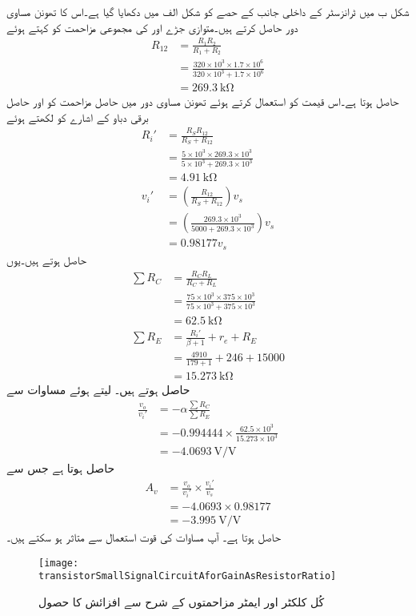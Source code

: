 شکل  ب میں ٹرانزسٹر کے داخلی جانب کے حصے کو شکل  الف  میں دکھایا گیا ہے۔اس کا تھونن مساوی دور حاصل کرتے ہیں۔متوازی جڑے  اور  کی مجموعی مزاحمت کو  کہتے ہوئے
\begin{align*}
R_{12}&=\frac{R_1 R_2}{R_1+R_2}\\
&=\frac{320 \times 10^3 \times 1.7 \times 10^6}{320 \times 10^3 + 1.7 \times 10^6}\\
&=\SI{269.3}{\kilo \ohm}
\end{align*}
حاصل ہوتا ہے۔اس قیمت کو استعمال کرتے ہوئے تھونن مساوی دور میں حاصل مزاحمت کو  اور حاصل برقی دباو کے اشارے کو  لکھتے ہوئے
\begin{align*}
R_i'&=\frac{R_S R_{12}}{R_S+R_{12}}\\
&=\frac{5\times 10^3 \times 269.3 \times 10^3}{5\times 10^3 + 269.3 \times 10^3}\\
&=\SI{4.91}{\kilo \ohm}\\
v_i'&=\left(\frac{R_{12}}{R_S+R_{12}} \right) v_s\\
&=\left(\frac{269.3 \times 10^3}{5000+269.3 \times 10^3} \right) v_s\\
&=0.98177 v_s
\end{align*}
حاصل ہوتے ہیں۔یوں
\begin{align*}
\sum R_C&=\frac{R_C R_L}{R_C+R_L}\\
&=\frac{75 \times 10^3 \times 375 \times 10^3}{75 \times 10^3 + 375 \times 10^3}\\
&=\SI{62.5}{\kilo \ohm}\\
\sum R_E&=\frac{R_i'}{\beta+1}+r_e+R_E\\
&=\frac{4910}{179+1}+246+15000\\
&=\SI{15.273}{\kilo \ohm}
\end{align*}
حاصل ہوتے ہیں۔  لیتے ہوئے  مساوات  سے
\begin{align*}
\frac{v_o}{v_i'}&=-\alpha \frac{\sum R_C}{\sum R_E}\\
&= -0.994444 \times \frac{62.5 \times 10^3}{15.273 \times 10^3}\\
&=\SI{-4.0693}{\volt \per \volt}
\end{align*}
حاصل ہوتا ہے جس سے
\begin{align*}
A_v&=\frac{v_o}{v_i'} \times \frac{v_i'}{v_s}\\
&=-4.0693 \times 0.98177\\
&=\SI{-3.995}{\volt \per \volt}
\end{align*}
حاصل ہوتا ہے۔ آپ مساوات  کی قوت استعمال سے متاثر ہو سکتے ہیں۔
\begin{figure}
\centering
\texttt{[image: transistorSmallSignalCircuitAforGainAsResistorRatio]}
\caption{کُل کلکٹر  اور ایمٹر مزاحمتوں کے شرح سے افزائش کا حصول}
\label{شکل_ٹرانزسٹر_افزائش_بطور_مزاحمت_کی_شرح}
\end{figure}

